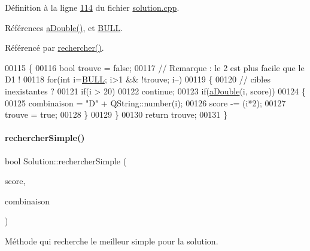 Définition à la ligne \hyperlink{solution_8cpp_source_l00114}{114} du fichier \hyperlink{solution_8cpp_source}{solution.\+cpp}.



Références \hyperlink{solution_8cpp_source_l00097}{a\+Double()}, et \hyperlink{darts_8h_source_l00022}{B\+U\+LL}.



Référencé par \hyperlink{solution_8cpp_source_l00217}{rechercher()}.


\begin{DoxyCode}
00115 \{
00116     \textcolor{keywordtype}{bool} trouve = \textcolor{keyword}{false};
00117     \textcolor{comment}{// Remarque : le 2 est plus facile que le D1 !}
00118     \textcolor{keywordflow}{for}(\textcolor{keywordtype}{int} i=\hyperlink{darts_8h_ac26e54839269cea6c170f2699af4ead2}{BULL}; i>1 && !trouve; i--)
00119     \{
00120         \textcolor{comment}{// cibles inexistantes ?}
00121         \textcolor{keywordflow}{if}(i > 20)
00122             \textcolor{keywordflow}{continue};
00123         \textcolor{keywordflow}{if}(\hyperlink{class_solution_ad79929c887a394883a154ea2ca9c3aac}{aDouble}(i, score))
00124         \{
00125             combinaison = \textcolor{stringliteral}{"D"} + QString::number(i);
00126             score -= (i*2);
00127             trouve = \textcolor{keyword}{true};
00128         \}
00129     \}
00130     \textcolor{keywordflow}{return} trouve;
00131 \}
\end{DoxyCode}
\mbox{\label{class_solution_ab8223455a5a35aceb7de18970f94db48}} 
\paragraph{\texorpdfstring{rechercher\+Simple()}{rechercherSimple()}}
{\footnotesize\ttfamily bool Solution\+::rechercher\+Simple (\begin{DoxyParamCaption}\item[{int \&}]{score,  }\item[{Q\+String \&}]{combinaison }\end{DoxyParamCaption})\hspace{0.3cm}{\ttfamily [private]}}



Méthode qui recherche le meilleur simple pour la solution. 


